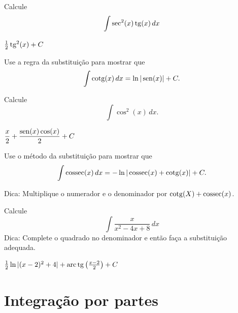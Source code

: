 \begin{exer}
  Calcule
  \begin{equation}
    \int\sec^2(x)\operatorname{tg}(x)\,dx
  \end{equation}
\end{exer}
\begin{resp}
  $\frac{1}{2}\operatorname{tg}^2(x) + C$
\end{resp}

\begin{exer}\label{exer:int_subs_cotg}
  Use a regra da substituição para mostrar que
  \begin{equation}
    \int \operatorname{cotg}(x)\,dx = \ln|\operatorname{sen}(x)| + C.
  \end{equation}
\end{exer}

\begin{exer}
  Calcule
  \begin{equation}
    \int \cos^2(x)\,dx.
  \end{equation}
\end{exer}
\begin{resp}
  $\displaystyle \frac{x}{2} + \frac{\operatorname{sen}(x)\cos(x)}{2} + C$
\end{resp}

\begin{exer}\label{exer:int_subs_cossec}
  Use o método da substituição para mostrar que
  \begin{equation}
    \int \operatorname{cossec}(x)\,dx = -\ln|\operatorname{cossec}(x)+\operatorname{cotg}(x)| + C.
  \end{equation}
\end{exer}
\begin{resp}
  Dica: Multiplique o numerador e o denominador por $\operatorname{cotg}(X)+\operatorname{cossec}(x)$.
\end{resp}

\begin{exer}
  Calcule
  \begin{equation}
    \int\frac{x}{x^2-4x+8}\,dx
  \end{equation}
  Dica: Complete o quadrado no denominador e então faça a substituição adequada.
\end{exer}
\begin{resp}
  $\frac{1}{2}\ln|(x-2)^2+4|+\operatorname{arc}\operatorname{tg}\left(\frac{x-2}{2}\right) + C$
\end{resp}


\section{Integração por partes}\label{cap_int_sec_partes}

